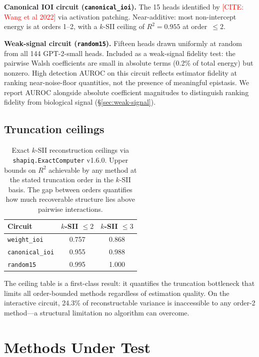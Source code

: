 \documentclass[11pt]{article}
\newcommand{\citeneeded}[1]{\textcolor{red}{[CITE: #1]}}
\begin{document}
\textbf{Canonical IOI circuit (\texttt{canonical\_ioi}).}
The 15 heads identified by \citeneeded{Wang et al 2022} via
activation patching. Near-additive: most non-intercept energy is at
orders 1--2, with a $k$-SII ceiling of $R^2 = 0.955$ at
order~$\leq 2$.

\textbf{Weak-signal circuit (\texttt{random15}).}
Fifteen heads drawn uniformly at random from all 144 GPT-2-small
heads. Included as a weak-signal fidelity test: the pairwise Walsh
coefficients are small in absolute terms (0.2\% of total energy) but
nonzero. High detection AUROC on this circuit reflects estimator
fidelity at ranking near-noise-floor quantities, not the presence of
meaningful epistasis. We report AUROC alongside absolute coefficient
magnitudes to distinguish ranking fidelity from biological signal
(\S\ref{sec:weak-signal}).

\subsection{Truncation ceilings}
\label{sec:ceilings}

\begin{table}[t]
\centering
\caption{Exact $k$-SII reconstruction ceilings via
\texttt{shapiq.ExactComputer} v1.6.0. Upper bounds on $R^2$
achievable by any method at the stated truncation order in the
$k$-SII basis. The gap between orders quantifies how much
recoverable structure lies above pairwise interactions.}
\label{tab:ceilings}
\begin{tabular}{lcc}
\toprule
Circuit & $k$-SII $\leq 2$ & $k$-SII $\leq 3$ \\
\midrule
\texttt{weight\_ioi} & 0.757 & 0.868 \\
\texttt{canonical\_ioi} & 0.955 & 0.988 \\
\texttt{random15} & 0.995 & 1.000 \\
\bottomrule
\end{tabular}
\end{table}

The ceiling table is a first-class result: it quantifies the
truncation bottleneck that limits all order-bounded methods
regardless of estimation quality. On the interactive circuit,
24.3\% of reconstructable variance is inaccessible to any
order-2 method---a structural limitation no algorithm can overcome.


\section{Methods Under Test}
\label{sec:methods}
\end{document}
